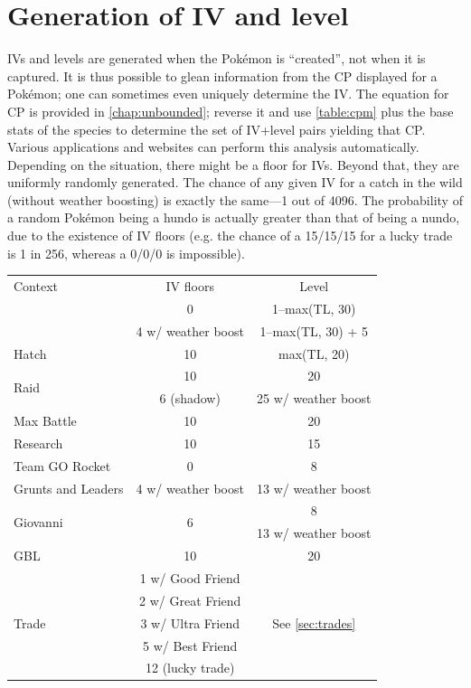\section{Generation of IV and level}
\label{sec:ivgeneration}
IVs and levels are generated when the Pokémon is ``created'', not when it is captured.
It is thus possible to glean information from the CP displayed for a Pokémon;
  one can sometimes even uniquely determine the IV\@.
The equation for CP is provided in \autoref{chap:unbounded}; reverse it and
  use \autoref{table:cpm} plus the base stats of the species to determine
  the set of IV+level pairs yielding that CP\@.
Various applications and websites can perform this analysis automatically.
Depending on the situation, there might be a floor for IVs.
Beyond that, they are uniformly randomly generated.
The chance of any given IV for a catch in the wild (without weather boosting)
  is exactly the same---1 out of 4096.
The probability of a random Pokémon being a hundo is actually
  greater than that of being a nundo, due to the existence of IV floors
  (e.g. the chance of a 15/15/15 for a lucky trade is 1 in 256, whereas
  a 0/0/0 is impossible).
\begin{table}
  \begin{center}
    \begin{tabular}{lcc}
      Context & IV floors & Level \\
      \Midrule
      \multirow{2}{*}{Wild catch} & 0 & 1--max(TL, 30) \\
      & 4 w/ weather boost & 1--max(TL, 30) + 5 \\
      Hatch & 10 & max(TL, 20) \\
      \multirow{2}{*}{Raid} & 10 & 20 \\
      & 6 (shadow) & 25 w/ weather boost \\
      Max Battle & 10 & 20 \\
      Research & 10 & 15 \\
      Team GO Rocket & 0 & 8 \\
      Grunts and Leaders & 4 w/ weather boost & 13 w/ weather boost \\
      \multirow{2}{*}{Giovanni} & \multirow{2}{*}{6} & 8\\
       & & 13 w/ weather boost\\
      GBL & 10 & 20\\
      \multirow{5}{*}{Trade} & 1 w/ Good Friend & \multirow{5}{*}{See \autoref{sec:trades}} \\
       & 2 w/ Great Friend & \\
       & 3 w/ Ultra Friend & \\
       & 5 w/ Best Friend & \\
       & 12 (lucky trade) & \\
    \end{tabular}
  \end{center}
\end{table}

